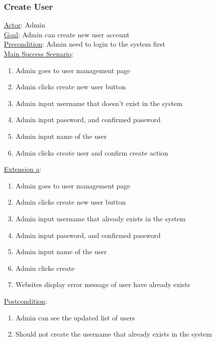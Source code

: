 \documentclass[12pt,oneside,openright,a4paper]{cpe-english-project}
\begin{document}
	\subsubsection{Create User}
	\underline{Actor}: Admin\\
	\underline{Goal}: Admin can create new user account\\
	\underline{Precondition}: Admin need to login to the system first\\
	\underline{Main Success Scenario}:
	\begin{enumerate}[label={\arabic*.}]
		\item Admin goes to user management page
		\item Admin clicks create new user button
		\item Admin input username that doesn’t exist in the system
		\item Admin input password, and confirmed password
		\item Admin input name of the user
		\item Admin clicks create user and confirm create action
	\end{enumerate}
	\underline{Extension a}:
	\begin{enumerate}[label={\arabic*.}]
		\item Admin goes to user management page
		\item Admin clicks create new user button
		\item Admin input username that already exists in the system
		\item Admin input password, and confirmed password
		\item Admin input name of the user
		\item Admin clicks create
		\item Websites display error message of user have already exists
	\end{enumerate}
	\underline{Postcondition}: 
	\begin{enumerate}[label={\arabic*.}]
		\item Admin can see the updated list of users
		\item Should not create the username that already exists in the system
	\end{enumerate}
\end{document}
